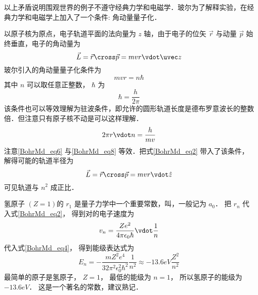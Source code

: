 以上矛盾说明围观世界的例子不遵守经典力学和电磁学．玻尔为了解释实验，在经典力学和电磁学上加入了一个条件: 角动量量子化．

以原子核为原点，电子轨道平面的法向量为 $z$ 轴，由于电子的位矢 $\vec r$ 与动量 $\vec p$ 始终垂直，电子的角动量为
\begin{equation}
\vec L = \vec r \cross \vec p = mvr \vdot \uvec z
\end{equation}
玻尔引入的角动量量子化条件为
\begin{equation}\label{BohrMd_eq6}
mvr = n\hbar 
\end{equation}
其中 $n$ 可以取任意正整数， $\hbar$ 为
\begin{equation}\label{BohrMd_eq7}
\hbar  = \frac{h}{{2\pi }}
\end{equation}
该条件也可以等效理解为驻波条件，即允许的圆形轨道长度是德布罗意波长的整数倍．但注意只有原子核不动是可以这样理解．
\begin{equation}\label{BohrMd_eq8}
2\pi r \vdot n = \frac{h}{{mv}}
\end{equation}
注意\autoref{BohrMd_eq6} 与\autoref{BohrMd_eq8} 等效．把式\autoref{BohrMd_eq2} 带入了该条件，解得可能的轨道半径为
\begin{equation}\label{BohrMd_eq9}
\vec L = \vec r \cross \vec p = mvr \vdot \hat z
\end{equation}
可见轨道与 $n^2$ 成正比．

氢原子 $(Z=1)$的 $r_1$ 是量子力学中一个重要常数，叫，一般记为 $a_0$． 把 $r_n$ 代入式\autoref{BohrMd_eq2}， 得到对的电子速度为
\begin{equation}\label{BohrMd_eq10}
{v_n} = \frac{{Z{e^2}}}{{4\pi {\epsilon _0}\hbar }} \vdot \frac{1}{n}
\end{equation}
代入式\autoref{BohrMd_eq4}， 得到能级表达式为
\begin{equation}\label{BohrMd_eq11}
{E_n} =  - \frac{{m{Z^2}{e^4}}}{{32{\pi ^2}\epsilon _0^2{\hbar ^2}}}\frac{1}{{{n^2}}} \approx  - 13.6eV\frac{{{Z^2}}}{{{n^2}}}
\end{equation}
最简单的原子是氢原子， $Z = 1$， 最低的能级为 $n = 1$， 所以氢原子的能级为 $-13.6eV$． 这是一个著名的常数，建议熟记．









